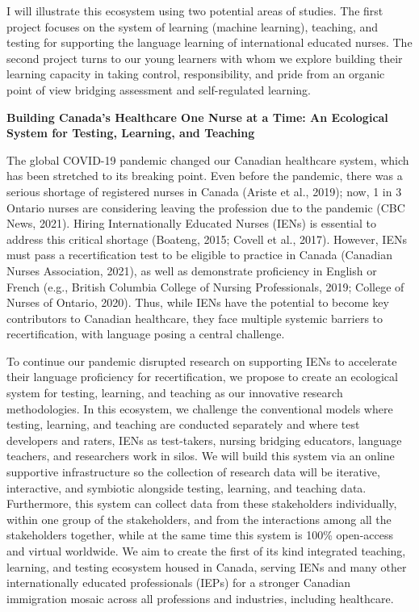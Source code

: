 \documentclass[
]{book}
\begin{document}
I will illustrate this ecosystem using two potential areas of studies. The first project focuses on the system of learning (machine learning), teaching, and testing for supporting the language learning of international educated nurses. The second project turns to our young learners with whom we explore building their learning capacity in taking control, responsibility, and pride from an organic point of view bridging assessment and self-regulated learning.

\textbf{Building Canada's Healthcare One Nurse at a Time: An Ecological System for Testing, Learning, and Teaching}

The global COVID-19 pandemic changed our Canadian healthcare system, which has been stretched to its breaking point. Even before the pandemic, there was a serious shortage of registered nurses in Canada (Ariste et al., 2019); now, 1 in 3 Ontario nurses are considering leaving the profession due to the pandemic (CBC News, 2021). Hiring Internationally Educated Nurses (IENs) is essential to address this critical shortage (Boateng, 2015; Covell et al., 2017). However, IENs must pass a recertification test to be eligible to practice in Canada (Canadian Nurses Association, 2021), as well as demonstrate proficiency in English or French (e.g., British Columbia College of Nursing Professionals, 2019; College of Nurses of Ontario, 2020). Thus, while IENs have the potential to become key contributors to Canadian healthcare, they face multiple systemic barriers to recertification, with language posing a central challenge.

To continue our pandemic disrupted research on supporting IENs to accelerate their language proficiency for recertification, we propose to create an ecological system for testing, learning, and teaching as our innovative research methodologies. In this ecosystem, we challenge the conventional models where testing, learning, and teaching are conducted separately and where test developers and raters, IENs as test-takers, nursing bridging educators, language teachers, and researchers work in silos. We will build this system via an online supportive infrastructure so the collection of research data will be iterative, interactive, and symbiotic alongside testing, learning, and teaching data. Furthermore, this system can collect data from these stakeholders individually, within one group of the stakeholders, and from the interactions among all the stakeholders together, while at the same time this system is 100\% open-access and virtual worldwide. We aim to create the first of its kind integrated teaching, learning, and testing ecosystem housed in Canada, serving IENs and many other internationally educated professionals (IEPs) for a stronger Canadian immigration mosaic across all professions and industries, including healthcare.
\end{document}
